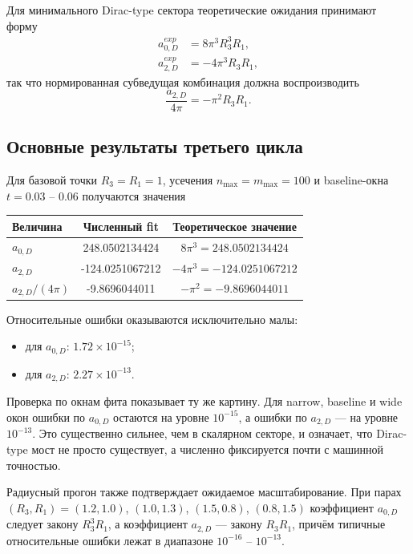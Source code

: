 \documentclass[12pt,a4paper]{article}
\begin{document}
Для минимального Dirac-type сектора теоретические ожидания принимают форму
\begin{align}
a_{0,D}^{exp} &= 8\pi^3 R_3^3R_1,\\
a_{2,D}^{exp} &= -4\pi^3 R_3R_1,
\end{align}
так что нормированная субведущая комбинация должна воспроизводить
\[
\frac{a_{2,D}}{4\pi}=-\pi^2 R_3R_1.
\]

\subsection{Основные результаты третьего цикла}

Для базовой точки \(R_3=R_1=1\), усечения \(n_{\max}=m_{\max}=100\) и baseline-окна \(t=0.03\) -- \(0.06\) получаются значения
\begin{center}
\begin{tabular}{lcc}
\toprule
Величина & Численный fit & Теоретическое значение \\
\midrule
$a_{0,D}$ & 248.0502134424 & $8\pi^3 = 248.0502134424$ \\
$a_{2,D}$ & -124.0251067212 & $-4\pi^3 = -124.0251067212$ \\
$a_{2,D}/(4\pi)$ & -9.8696044011 & $-\pi^2 = -9.8696044011$ \\
\bottomrule
\end{tabular}
\end{center}

Относительные ошибки оказываются исключительно малы:
\begin{itemize}
    \item для \(a_{0,D}\): \(1.72\times 10^{-15}\);
    \item для \(a_{2,D}\): \(2.27\times 10^{-13}\).
\end{itemize}

Проверка по окнам фита показывает ту же картину. Для narrow, baseline и wide окон ошибки по \(a_{0,D}\) остаются на уровне \(10^{-15}\), а ошибки по \(a_{2,D}\) --- на уровне \(10^{-13}\). Это существенно сильнее, чем в скалярном секторе, и означает, что Dirac-type мост не просто существует, а численно фиксируется почти с машинной точностью.

Радиусный прогон также подтверждает ожидаемое масштабирование. При парах \((R_3,R_1)=(1.2,1.0)\), \((1.0,1.3)\), \((1.5,0.8)\), \((0.8,1.5)\) коэффициент \(a_{0,D}\) следует закону \(R_3^3R_1\), а коэффициент \(a_{2,D}\) --- закону \(R_3R_1\), причём типичные относительные ошибки лежат в диапазоне \(10^{-16}\) -- \(10^{-13}\).
\end{document}
